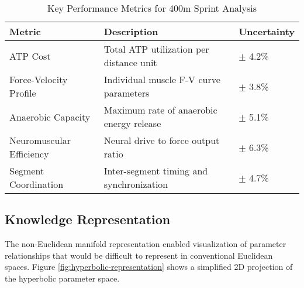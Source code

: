 \documentclass[journal,onecolumn]{IEEEtran}
\begin{document}
\begin{table}[ht]
\centering
\caption{Key Performance Metrics for 400m Sprint Analysis}
\label{tab:key-metrics}
\begin{tabular}{lp{7cm}p{3cm}}
\toprule
\textbf{Metric} & \textbf{Description} & \textbf{Uncertainty} \\
\midrule
ATP Cost & Total ATP utilization per distance unit & $\pm$ 4.2\% \\
Force-Velocity Profile & Individual muscle F-V curve parameters & $\pm$ 3.8\% \\
Anaerobic Capacity & Maximum rate of anaerobic energy release & $\pm$ 5.1\% \\
Neuromuscular Efficiency & Neural drive to force output ratio & $\pm$ 6.3\% \\
Segment Coordination & Inter-segment timing and synchronization & $\pm$ 4.7\% \\
\bottomrule
\end{tabular}
\end{table}

\subsection{Knowledge Representation}

The non-Euclidean manifold representation enabled visualization of parameter relationships that would be difficult to represent in conventional Euclidean spaces. Figure \ref{fig:hyperbolic-representation} shows a simplified 2D projection of the hyperbolic parameter space.
\end{document}
